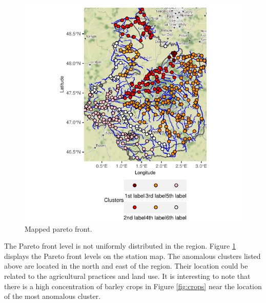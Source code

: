 \begin{itemize}
\end{itemize}

\begin{figure}[htbp]
  \centering
  \includegraphics[]{figs/Chap5/Pareto_map.pdf}
  \caption{Mapped pareto front.}
  \label{fig:pareto:map}
\end{figure}

The Pareto front level is not uniformly distributed in the region. Figure \ref{fig:pareto:map} displays the Pareto front levels on the station map. The anomalous clusters listed above are located in the north and east of the region. Their location could be related to the agricultural practices and land use. It is interesting to note that there is a high concentration of barley crops in Figure \ref{fig:crops} near the location of the most anomalous cluster. 

